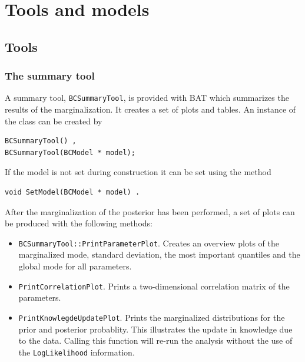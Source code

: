 \documentclass[11pt, a4paper]{article}
\begin{document}

\clearpage
\pagebreak

\section{Tools and models}
\label{section:tools}

\subsection{Tools}
\label{subsection:tools}

\subsubsection{The summary tool}

A summary tool, \verb|BCSummaryTool|, is provided with BAT which
summarizes the results of the marginalization. It creates a set of
plots and tables. An instance of the class can be created by
%
\begin{verbatim}
BCSummaryTool() ,
BCSummaryTool(BCModel * model);
\end{verbatim}
%
If the model is not set during construction it can be set using the
method
%
\begin{verbatim}
void SetModel(BCModel * model) .
\end{verbatim}

\noindent
After the marginalization of the posterior has been performed, a
set of plots can be produced with the following methods:
%
\begin{itemize}
\item \verb|BCSummaryTool::PrintParameterPlot|. Creates an overview
plots of the marginalized mode, standard deviation, the most important
quantiles and the global mode for all parameters.
\item \verb|PrintCorrelationPlot|. Prints a two-dimensional
correlation matrix of the parameters.
\item \verb|PrintKnowlegdeUpdatePlot|. Prints the marginalized
distributions for the prior and posterior probablity. This illustrates
the update in knowledge due to the data. Calling this function will
re-run the analysis without the use of the \verb|LogLikelihood|
information.
\end{itemize}
\end{document}
